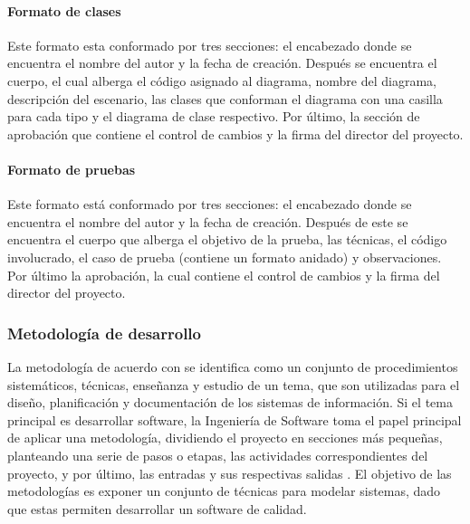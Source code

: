 \paragraph{Formato de clases} Este formato esta conformado  por tres secciones: el encabezado donde se encuentra el nombre del autor y la fecha de creación. Después se encuentra el cuerpo, el cual alberga el código asignado al diagrama, nombre del diagrama, descripción del escenario, las clases que conforman el diagrama con una casilla para cada tipo y el diagrama de clase respectivo. Por último, la sección de aprobación que contiene el control de cambios y la firma del director del proyecto.

\paragraph{Formato de pruebas} Este formato está conformado por tres secciones: el encabezado donde se encuentra el nombre del autor y la fecha de creación. Después de este se encuentra el cuerpo que alberga el objetivo de la prueba, las técnicas, el código involucrado, el caso de prueba (contiene un formato anidado) y observaciones. Por último la aprobación, la cual contiene el control de cambios y la firma del director del proyecto.

\subsubsection{Metodología de desarrollo}
La metodología de acuerdo con \textcite{CambridgeDefMethodology} se identifica como un conjunto de procedimientos sistemáticos, técnicas, enseñanza y estudio de un tema, que son utilizadas para el diseño, planificación y documentación de los sistemas de información. Si el tema principal es desarrollar software, la Ingeniería de Software toma el papel principal de aplicar una metodología, dividiendo el proyecto en secciones más pequeñas, planteando una serie de pasos o etapas, las actividades correspondientes del proyecto, y por último, las entradas y sus respectivas salidas \parencite{Sommerville2005}. El objetivo de las metodologías es exponer un conjunto de técnicas para modelar sistemas, dado que estas permiten desarrollar un software de calidad.

